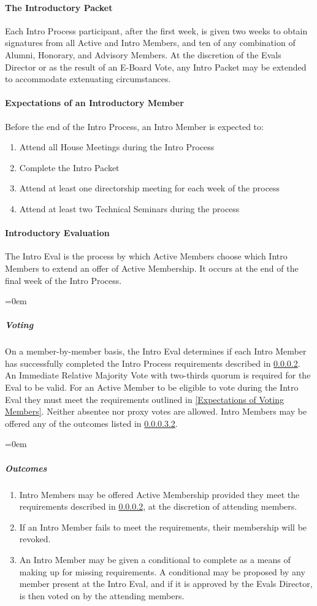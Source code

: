 \documentclass{article}
\newcommand{\asubsubsection}[1]{\paragraph{#1} \label{#1}}
\newcommand{\asubsubsubsection}[1]{\parindent=0em\subparagraph{#1} \label{#1}}
\begin{document}
\asubsubsection{The Introductory Packet}
Each Intro Process participant, after the first week, is given two weeks to obtain signatures from all Active and Intro Members, and ten of any combination of Alumni, Honorary, and Advisory Members.
At the discretion of the Evals Director or as the result of an E-Board Vote, any Intro Packet may be extended to accommodate extenuating circumstances.

\asubsubsection{Expectations of an Introductory Member}
\renewcommand{\theenumi}{\arabic{enumi}} %
Before the end of the Intro Process, an Intro Member is expected to:
\begin{enumerate}
	\item Attend all House Meetings during the Intro Process
	\item Complete the Intro Packet
	\item Attend at least one directorship meeting for each week of the process
	\item Attend at least two Technical Seminars during the process
\end{enumerate}

\asubsubsection{Introductory Evaluation}
The Intro Eval is the process by which Active Members choose which Intro Members to extend an offer of Active Membership.
It occurs at the end of the final week of the Intro Process.

\asubsubsubsection{Voting}
On a member-by-member basis, the Intro Eval determines if each Intro Member has successfully completed the Intro Process requirements described in \ref{Expectations of an Introductory Member}.
An Immediate Relative Majority Vote with two-thirds quorum is required for the Eval to be valid.
For an Active Member to be eligible to vote during the Intro Eval they must meet the requirements outlined in \ref{Expectations of Voting Members}.
Neither absentee nor proxy votes are allowed.
Intro Members may be offered any of the outcomes listed in \ref{Outcomes}.

\asubsubsubsection{Outcomes}
\renewcommand{\theenumi}{\alph{enumi}} %
\begin{enumerate}
	\item Intro Members may be offered Active Membership provided they meet the requirements described in \ref{Expectations of an Introductory Member}, at the discretion of attending members.
	\item If an Intro Member fails to meet the requirements, their membership will be revoked.
	\item An Intro Member may be given a conditional to complete as a means of making up for missing requirements.
	      A conditional may be proposed by any member present at the Intro Eval, and if it is approved by the Evals Director, is then voted on by the attending members.
\end{enumerate}
\end{document}
